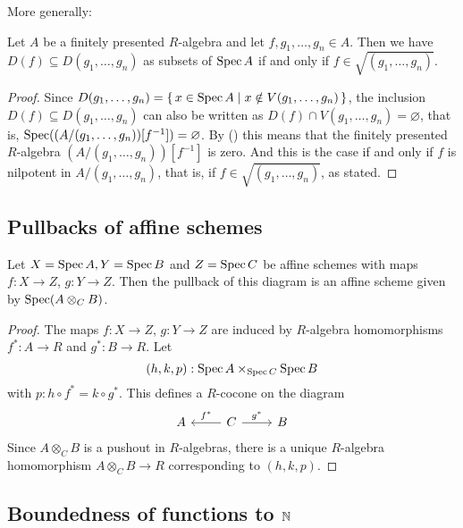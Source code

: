 More generally:

\begin{lemma}%
  Let $A$ be a finitely presented $R$-algebra
  and let $f, g_1, \dots, g_n \in A$.
  Then we have $D(f) \subseteq D(g_1, \dots, g_n)$
  as subsets of $\operatorname{Spec} A$
  if and only if $f \in \sqrt{(g_1, \dots, g_n)}$.
\end{lemma}

\begin{proof}
  Since $D(g_1, \dots, g_n) = \{\, x \in \operatorname{Spec} A \mid x \notin V(g_1, \dots, g_n) \,\}$,
  the inclusion $D(f) \subseteq D(g_1, \dots, g_n)$
  can also be written as
  $D(f) \cap V(g_1, \dots, g_n) = \varnothing$, that is,
  $\operatorname{Spec}((A/(g_1, \dots, g_n))[f^{-1}]) = \varnothing$.
  By ()
  this means that the finitely presented $R$-algebra $(A/(g_1, \dots, g_n))[f^{-1}]$
  is zero.
  And this is the case if and only if $f$ is nilpotent in $A/(g_1, \dots, g_n)$,
  that is, if $f \in \sqrt{(g_1, \dots, g_n)}$, as stated.
\end{proof}

\subsection{Pullbacks of affine schemes}

\begin{lemma}%
  \label{affine-fiber-product}
  Let $X=\operatorname{Spec} A,Y=\operatorname{Spec} B$ and $Z=\operatorname{Spec} C$ be affine schemes
  with maps $f:X\to Z$, $g:Y\to Z$.
  Then the pullback of this diagram is an affine scheme given by $\operatorname{Spec} (A\otimes_C B)$.
\end{lemma}

\begin{proof}
  The maps $f:X\to Z$, $g:Y\to Z$ are induced by $R$-algebra homomorphisms $f^*:A\to R$ and $g^*:B\to R$.
  Let
  \[ (h,k,p) : \operatorname{Spec} A \times_{\operatorname{Spec} C} \operatorname{Spec} B \]
  with $p:h\circ f^*=k\circ g^* $.
  This defines a $R$-cocone on the diagram
  \[
    \begin{tikzcd}
      A & C\ar[r,"g^*"]\ar[l,"f^*",swap] & B
    \end{tikzcd}
  \]
  Since $A\otimes_C B$ is a pushout in $R$-algebras,
  there is a unique $R$-algebra homomorphism $A\otimes_C B \to R$ corresponding to $(h,k,p)$.
\end{proof}

\subsection{Boundedness of functions to $\mathbb{N}$}


